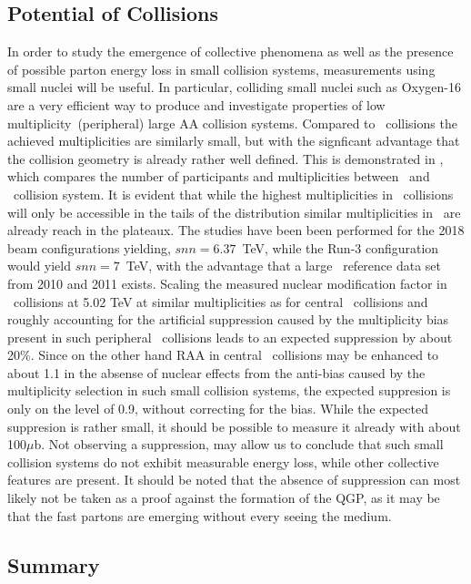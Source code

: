 \documentclass[../report.tex]{subfiles}
\def\snn{snn}
\begin{document}
\subsection{Potential of \OO Collisions}
In order to study the emergence of collective phenomena as well as the presence of possible parton energy loss in small collision systems, measurements using small nuclei will be useful.
In particular, colliding small nuclei such as Oxygen-16 are a very efficient way to produce and investigate properties of low multiplicity~(peripheral) large AA collision systems.
Compared to \pPb\ collisions the achieved multiplicities are similarly small, but with the signficant advantage that the collision geometry is already rather well defined.
This is demonstrated in , which compares the number of participants and multiplicities between \OO\ and \pPb\ collision system.
It is evident that while the highest multiplicities in \pPb\ collisions will only be accessible in the tails of the distribution similar multiplicities in \OO\ are already reach in the plateaux.
The studies have been been performed for the 2018  beam configurations yielding, $\snn=6.37$~TeV, while the Run-3 configuration would yield $\snn=7$~TeV, with the advantage that a large \pp\ reference data set from 2010 and 2011
exists.
Scaling the measured nuclear modification factor in \PbPb\ collisions at 5.02 TeV at similar multiplicities as for central \OO\ collisions and roughly accounting for the artificial suppression caused by the multiplicity bias present in such peripheral \PbPb\ collisions leads to an expected suppression by about 20\%.
Since on the other hand RAA in central \OO\ collisions may be enhanced to about 1.1 in the absense of nuclear effects from the anti-bias caused by the multiplicity selection in such small collision systems, the expected suppresion is only on the level of 0.9, without correcting for the bias.
While the expected suppresion is rather small, it should be possible to measure it already with about 100$\mu$b.
Not observing a suppression, may allow us to conclude that such small collision systems do not exhibit measurable energy loss, while other collective features are present.
It should be noted that the absence of suppression can most likely not be taken as a proof against the formation of the QGP, as it may be that the fast partons are emerging without every seeing the medium.

\subsection{Summary}
\end{document}

